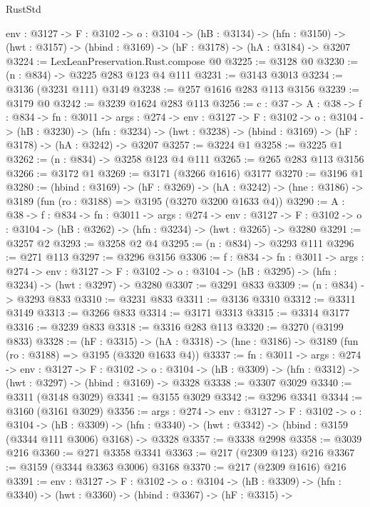 \begin{lexlean}{RustStd}
\begin{coremodule}
  {env : @3127} ->
  {F : @3102} ->
  {o : @3104} ->
  (hB : @3134) ->
  (hfn : @3150) -> (hwt : @3157) -> (hbind : @3169) -> (hF : @3178) -> (hA : @3184) -> @3207
@3224 := LexLeanPreservation.Rust.compose @0
@3225 := @3128 @0
@3230 := (n : @834) -> @3225 @283 @123 @4 @111
@3231 := @3143 @3013
@3234 := @3136 (@3231 @111) @3149
@3238 := @257 @1616 @283 @113 @3156
@3239 := @3179 @0
@3242 := @3239 @1624 @283 @113
@3256 := {c : @37} ->
  {A : @38} ->
  {f : @834} ->
  {fn : @3011} ->
  {args : @274} ->
  {env : @3127} ->
  {F : @3102} ->
  {o : @3104} ->
  (hB : @3230) ->
  (hfn : @3234) -> (hwt : @3238) -> (hbind : @3169) -> (hF : @3178) -> (hA : @3242) -> @3207
@3257 := @3224 @1
@3258 := @3225 @1
@3262 := (n : @834) -> @3258 @123 @4 @111
@3265 := @265 @283 @113 @3156
@3266 := @3172 @1
@3269 := @3171 (@3266 @1616) @3177
@3270 := @3196 @1
@3280 := (hbind : @3169) ->
  (hF : @3269) ->
  (hA : @3242) -> (hne : @3186) -> @3189 (fun (ro : @3188) => @3195 (@3270 @3200 @1633 @4))
@3290 := {A : @38} ->
  {f : @834} ->
  {fn : @3011} ->
  {args : @274} ->
  {env : @3127} ->
  {F : @3102} -> {o : @3104} -> (hB : @3262) -> (hfn : @3234) -> (hwt : @3265) -> @3280
@3291 := @3257 @2
@3293 := @3258 @2 @4
@3295 := (n : @834) -> @3293 @111
@3296 := @271 @113
@3297 := @3296 @3156
@3306 := {f : @834} ->
  {fn : @3011} ->
  {args : @274} ->
  {env : @3127} ->
  {F : @3102} -> {o : @3104} -> (hB : @3295) -> (hfn : @3234) -> (hwt : @3297) -> @3280
@3307 := @3291 @833
@3309 := (n : @834) -> @3293 @833
@3310 := @3231 @833
@3311 := @3136 @3310
@3312 := @3311 @3149
@3313 := @3266 @833
@3314 := @3171 @3313
@3315 := @3314 @3177
@3316 := @3239 @833
@3318 := @3316 @283 @113
@3320 := @3270 (@3199 @833)
@3328 := (hF : @3315) ->
  (hA : @3318) -> (hne : @3186) -> @3189 (fun (ro : @3188) => @3195 (@3320 @1633 @4))
@3337 := {fn : @3011} ->
  {args : @274} ->
  {env : @3127} ->
  {F : @3102} ->
  {o : @3104} -> (hB : @3309) -> (hfn : @3312) -> (hwt : @3297) -> (hbind : @3169) -> @3328
@3338 := @3307 @3029
@3340 := @3311 (@3148 @3029)
@3341 := @3155 @3029
@3342 := @3296 @3341
@3344 := @3160 (@3161 @3029)
@3356 := {args : @274} ->
  {env : @3127} ->
  {F : @3102} ->
  {o : @3104} ->
  (hB : @3309) ->
  (hfn : @3340) -> (hwt : @3342) -> (hbind : @3159 (@3344 @111 @3006) @3168) -> @3328
@3357 := @3338 @2998
@3358 := @3039 @216
@3360 := @271 @3358 @3341
@3363 := @217 (@2309 @123) @216
@3367 := @3159 (@3344 @3363 @3006) @3168
@3370 := @217 (@2309 @1616) @216
@3391 := {env : @3127} ->
  {F : @3102} ->
  {o : @3104} ->
  (hB : @3309) ->
  (hfn : @3340) ->
  (hwt : @3360) ->
  (hbind : @3367) ->
  (hF : @3315) ->

\end{coremodule}
\end{lexlean}
